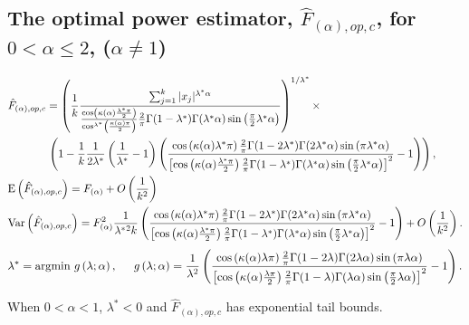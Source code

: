 \documentclass[oneside,10pt]{article}
\begin{document}
\subsection{The optimal power estimator, $\hat{F}_{(\alpha),op,c}$, for $0<\alpha\leq 2$, ($\alpha\neq1$)} \begin{align}\notag
&\hat{F}_{(\alpha),op,c}
= \left(\frac{1}{k}\frac{\sum_{j=1}^k|x_j|^{\lambda^*
    \alpha}}{\frac{\cos\left(\kappa(\alpha)\frac{\lambda^*\pi}{2}\right) }{\cos^{\lambda^*}\left(\frac{\kappa(\alpha)\pi}{2}\right)
    }\frac{2}{\pi}
  \Gamma(1-\lambda^*)\Gamma(\lambda^*\alpha)\sin\left(\frac{\pi}{2}\lambda^*\alpha\right)} \right)^{1/\lambda^*}\times\\\notag
  &\hspace{0.5in} \left(1-\frac{1}{k}\frac{1}{2\lambda^*}\left(\frac{1}{\lambda^*}-1\right)\left(\frac{\cos\left(\kappa(\alpha){\lambda^*\pi}\right)\frac{2}{\pi}
  \Gamma(1-2\lambda^*)\Gamma(2\lambda^*\alpha)\sin\left(\pi\lambda^*\alpha\right)}{\left[\cos\left(\kappa(\alpha)\frac{\lambda^*\pi}{2}\right)\frac{2}{\pi}
  \Gamma(1-\lambda^*)\Gamma(\lambda^*\alpha)\sin\left(\frac{\pi}{2}\lambda^*\alpha\right)\right]^2}-1  \right) \right),\\\notag
&\text{E}\left(\hat{F}_{(\alpha),op,c}\right) = F_{(\alpha)} + O\left(\frac{1}{k^2}\right)\\\notag
&\text{Var}\left(\hat{F}_{(\alpha),op, c}\right)
=  F_{(\alpha)}^{2}\frac{1}{\lambda^*{^2}k}\left(\frac{\cos\left(\kappa(\alpha){\lambda^*\pi}\right)\frac{2}{\pi}
  \Gamma(1-2\lambda^*)\Gamma(2\lambda^*\alpha)\sin\left(\pi\lambda^*\alpha\right)}{\left[\cos\left(\kappa(\alpha)\frac{\lambda^*\pi}{2}\right)\frac{2}{\pi}
  \Gamma(1-\lambda^*)\Gamma(\lambda^*\alpha)\sin\left(\frac{\pi}{2}\lambda^*\alpha\right)\right]^2}-1  \right) + O\left(\frac{1}{k^2}\right).
\end{align}
\begin{align}\notag
\lambda^* = \underset{}{\text{argmin}}\ g\left(\lambda;\alpha\right), \hspace{0.2in}
g\left(\lambda;\alpha\right) =  \frac{1}{\lambda^2}\left(\frac{\cos\left(\kappa(\alpha){\lambda\pi}\right)\frac{2}{\pi}
  \Gamma(1-2\lambda)\Gamma(2\lambda\alpha)\sin\left(\pi\lambda\alpha\right)}{\left[\cos\left(\kappa(\alpha)\frac{\lambda\pi}{2}\right)\frac{2}{\pi}
  \Gamma(1-\lambda)\Gamma(\lambda\alpha)\sin\left(\frac{\pi}{2}\lambda\alpha\right)\right]^2}-1  \right).
\end{align}

When $0<\alpha<1$,  $\lambda^*<0$ and $\hat{F}_{(\alpha),op,c}$ has exponential tail bounds.
\end{document}
